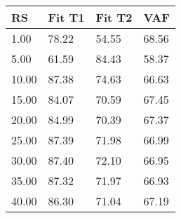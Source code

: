 \begin{tabular}{llll}
RS & Fit T1 & Fit T2 & VAF \\ 
\hline 
 1.00 & 78.22 & 54.55 & 68.56 \\ 
 5.00 & 61.59 & 84.43 & 58.37 \\ 
10.00 & 87.38 & 74.63 & 66.63 \\ 
15.00 & 84.07 & 70.59 & 67.45 \\ 
20.00 & 84.99 & 70.39 & 67.37 \\ 
25.00 & 87.39 & 71.98 & 66.99 \\ 
30.00 & 87.40 & 72.10 & 66.95 \\ 
35.00 & 87.32 & 71.97 & 66.93 \\ 
40.00 & 86.30 & 71.04 & 67.19 \\ 
\hline 
\end{tabular}